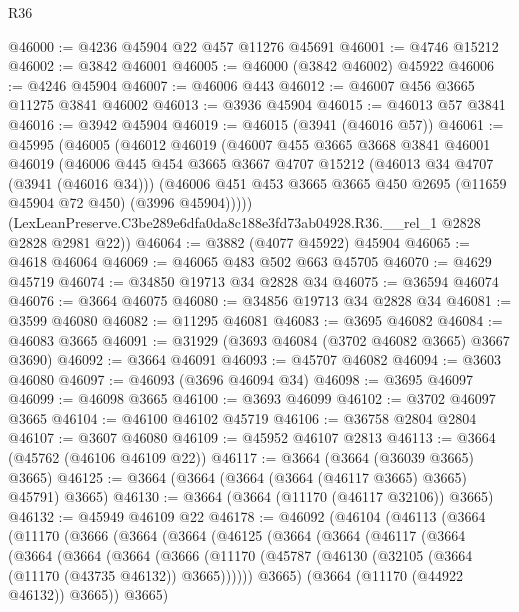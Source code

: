 \begin{lexlean}{R36}
\begin{coremodule}
@46000 := @4236 @45904 @22 @457 @11276 @45691
@46001 := @4746 @15212
@46002 := @3842 @46001
@46005 := @46000 (@3842 @46002) @45922
@46006 := @4246 @45904
@46007 := @46006 @443
@46012 := @46007 @456 @3665 @11275 @3841 @46002
@46013 := @3936 @45904
@46015 := @46013 @57 @3841
@46016 := @3942 @45904
@46019 := @46015 (@3941 (@46016 @57))
@46061 := @45995
    (@46005
      (@46012
        @46019
        (@46007
          @455
          @3665
          @3668
          @3841
          @46001
          @46019
          (@46006
            @445
            @454
            @3665
            @3667
            @4707
            @15212
            (@46013 @34 @4707 (@3941 (@46016 @34)))
            (@46006 @451 @453 @3665 @3665 @450 @2695 (@11659 @45904 @72 @450) (@3996 @45904)))))
      (LexLeanPreserve.C3be289e6dfa0da8c188e3fd73ab04928.R36.__rel_1 @2828 @2828 @2981 @22))
@46064 := @3882 (@4077 @45922) @45904
@46065 := @4618 @46064
@46069 := @46065 @483 @502 @663 @45705
@46070 := @4629 @45719
@46074 := @34850 @19713 @34 @2828 @34
@46075 := @36594 @46074
@46076 := @3664 @46075
@46080 := @34856 @19713 @34 @2828 @34
@46081 := @3599 @46080
@46082 := @11295 @46081
@46083 := @3695 @46082
@46084 := @46083 @3665
@46091 := @31929 (@3693 @46084 (@3702 @46082 @3665) @3667 @3690)
@46092 := @3664 @46091
@46093 := @45707 @46082
@46094 := @3603 @46080
@46097 := @46093 (@3696 @46094 @34)
@46098 := @3695 @46097
@46099 := @46098 @3665
@46100 := @3693 @46099
@46102 := @3702 @46097 @3665
@46104 := @46100 @46102 @45719
@46106 := @36758 @2804 @2804
@46107 := @3607 @46080
@46109 := @45952 @46107 @2813
@46113 := @3664 (@45762 (@46106 @46109 @22))
@46117 := @3664 (@3664 (@36039 @3665) @3665)
@46125 := @3664 (@3664 (@3664 (@3664 (@46117 @3665) @3665) @45791) @3665)
@46130 := @3664 (@3664 (@11170 (@46117 @32106)) @3665)
@46132 := @45949 @46109 @22
@46178 := @46092
    (@46104
      (@46113
        (@3664
          (@11170
            (@3666
              (@3664
                (@3664
                  (@46125
                    (@3664
                      (@3664
                        (@46117
                          (@3664
                            (@3664
                              (@3664
                                (@3664
                                  (@3666
                                    (@11170
                                      (@45787
                                        (@46130 (@32105 (@3664 (@11170 (@43735 @46132)) @3665))))))
                                  @3665)
                                (@3664 (@11170 (@44922 @46132)) @3665))
                              @3665)

\end{coremodule}
\end{lexlean}
